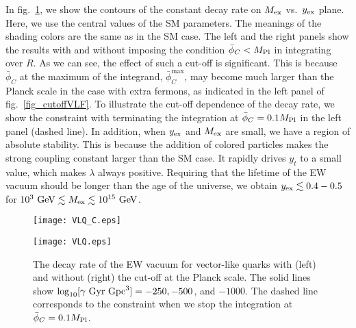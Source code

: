 \documentclass[12pt]{article}
\begin{document}
In fig.\ \ref{fig_VLQ}, we show the contours of the constant decay rate
on $M_{\rm ex}$ vs.\ $y_{\rm ex}$ plane.  Here, we use the central
values of the SM parameters. The meanings of the shading colors are the
same as in the SM case. The left and the right panels show the results
with and without imposing the condition $\bar{\phi}_C<M_{\rm Pl}$ in
integrating over $R$. As we can see, the effect of such a cut-off is
significant. This is because $\bar\phi_C$ at the maximum of the
integrand, $\bar\phi_C^{\max}$, may become much larger than the Planck
scale in the case with extra fermons, as indicated in the left panel of
fig.\ \ref{fig_cutoffVLF}. To illustrate the cut-off dependence of the
decay rate, we show the constraint with terminating the integration at
$\bar\phi_C=0.1M_{\rm Pl}$ in the left panel (dashed line).  In
addition, when $y_{\rm ex}$ and $M_{\rm ex}$ are small, we have a region
of absolute stability. This is because the addition of colored particles
makes the strong coupling constant larger than the SM case. It rapidly
drives $y_t$ to a small value, which makes $\lambda$ always positive.
Requiring that the lifetime of the EW vacuum should be longer than the
age of the universe, we obtain $y_{\rm ex}\lesssim0.4-0.5$ for
$10^3~{\rm GeV}\lesssim M_{\rm ex}\lesssim10^{15}~{\rm GeV}$.

\begin{figure}[t]
 \begin{minipage}{0.49\linewidth}
  \begin{center}
   \texttt{[image: VLQ\_C.eps]}
  \end{center}
 \end{minipage}
 \begin{minipage}{0.49\linewidth}
  \begin{center}
   \texttt{[image: VLQ.eps]}
  \end{center}
 \end{minipage}
 \caption{The decay rate of the EW vacuum for vector-like quarks with
 (left) and without (right) the cut-off at the Planck scale. The solid
 lines show $\log_{10}[\gamma~{\rm Gyr}~{\rm
 Gpc}^3]=-250,-500$, and $-1000$. The dashed line corresponds to the constraint
 when we stop the integration at $\bar\phi_C=0.1M_{\rm Pl}$.}
 \label{fig_VLQ}
\end{figure}
\end{document}
